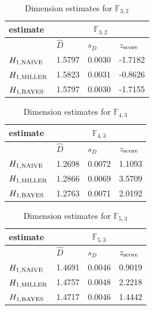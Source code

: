 \documentclass[a4paper,10pt]{article}
\begin{document}
\begin{thebibliography}{99}
\begin{table}[H] 
\begin{center}
\caption{Dimension estimates for $\mathbb{F}_{3,2}$}
\label{tab:est1s}
\begin{tabular}{|l|l|l|l|}
\hline
 estimate & \multicolumn{3}{c|}{$\mathbb{F}_{3,2}$} \\
\hline
 & $\hat{D}$ & $s_{D}$ & $z_{\mbox{\scriptsize{score}}}$ \\
\hline
$ H_{1,\mbox{\scriptsize{NAIVE}}} $ & 1.5797 & 0.0030 & -1.7182 \\ 
\hline 
$ H_{1,\mbox{\scriptsize{MILLER}}} $ & 1.5823 & 0.0031 & -0.8626 \\ 
\hline 
$ H_{1,\mbox{\scriptsize{BAYES}}} $ & 1.5797 & 0.0030 & -1.7155 \\ 
\hline 
\end{tabular}
\end{center}
\end{table}

\begin{table}[H] 
\begin{center}
\caption{Dimension estimates for $\mathbb{F}_{4,3}$}
\label{tab:est2s}
\begin{tabular}{|l|l|l|l|}
\hline
 estimate & \multicolumn{3}{c|}{$\mathbb{F}_{4,3}$} \\
\hline
 & $\hat{D}$ & $s_{D}$ & $z_{\mbox{\scriptsize{score}}}$ \\
\hline 
$ H_{1,\mbox{\scriptsize{NAIVE}}} $ & 1.2698 & 0.0072 & 1.1093 \\ 
\hline 
$ H_{1,\mbox{\scriptsize{MILLER}}} $ & 1.2866 & 0.0069 & 3.5709 \\ 
\hline 
$ H_{1,\mbox{\scriptsize{BAYES}}} $ & 1.2763 & 0.0071 & 2.0192 \\ 
\hline 
\end{tabular}
\end{center}
\end{table}

\begin{table}[H] 
\begin{center}
\caption{Dimension estimates for $\mathbb{F}_{5,3}$}
\label{tab:est3s}
\begin{tabular}{|l|l|l|l|}
\hline
 estimate & \multicolumn{3}{c|}{$\mathbb{F}_{5,3}$} \\
\hline
 & $\hat{D}$ & $s_{D}$ & $z_{\mbox{\scriptsize{score}}}$ \\
\hline 
$ H_{1,\mbox{\scriptsize{NAIVE}}} $ & 1.4691 & 0.0046 & 0.9019 \\ 
\hline 
$ H_{1,\mbox{\scriptsize{MILLER}}} $ & 1.4757 & 0.0048 & 2.2218 \\ 
\hline 
$ H_{1,\mbox{\scriptsize{BAYES}}} $ & 1.4717 & 0.0046 & 1.4442 \\ 
\hline 
\end{tabular}
\end{center}
\end{table}


\end{thebibliography}
\end{document}
